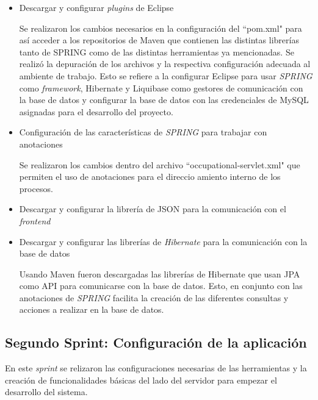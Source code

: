 \begin{enumerate}
\begin{itemize}
           \item Descargar y configurar \textit{plugins} de Eclipse
           
           Se realizaron los cambios necesarios en la configuración del ``pom.xml" para así acceder a los repositorios de Maven que contienen las distintas librerías tanto de SPRING como de las distintas herramientas ya mencionadas. Se realizó la depuración de los archivos y la respectiva configuración adecuada al ambiente de trabajo. Esto se refiere a la configurar Eclipse para usar \textit{SPRING} como \textit{framework}, Hibernate y Liquibase como gestores de comunicación con la base de datos y configurar la base de datos con las credenciales de MySQL asignadas para el desarrollo del proyecto.
           
           \item Configuración de las características de \textit{SPRING} para trabajar con anotaciones
           
           Se realizaron los cambios dentro del archivo ``occupational-servlet.xml" que permiten el uso de anotaciones para el direccio amiento interno de los procesos.
           
           
           \item Descargar y configurar la librería de JSON para la comunicación con el \textit{frontend}            
           
           
           \item Descargar y configurar las librerías de \textit{Hibernate} para la comunicación con la base de datos
           
           Usando Maven fueron descargadas las librerías de Hibernate que usan JPA como API para comunicarse con la base de datos. Esto, en conjunto con las anotaciones de \textit{SPRING} facilita la creación de las diferentes consultas y acciones a realizar en la base de datos.
        \end{itemize}
    \end{enumerate}
        
        
    \subsection{Segundo Sprint: Configuración de la aplicación}
    
    En este \textit{sprint} se relizaron las configuraciones necesarias de las herramientas y la creación de funcionalidades básicas del lado del servidor para empezar el desarrollo del sistema.
    
